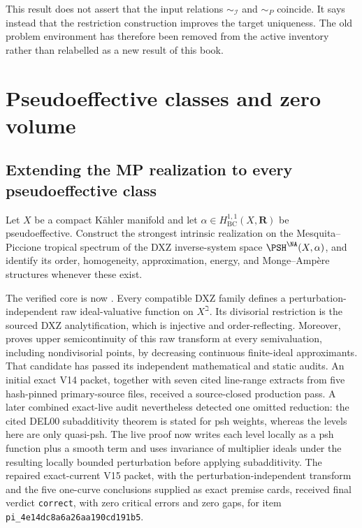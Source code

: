 This result does not assert that the input relations
\(\sim_{\mathcal I}\) and \(\sim_P\) coincide.  It says instead that the
restriction construction improves the target uniqueness.  The old problem
environment has therefore been removed from the active inventory rather
than relabelled as a new result of this book.

\section{Pseudoeffective classes and zero volume}
\label{sec:ch72-pseff-frontier}

\subsection{Extending the MP realization to every pseudoeffective class}
\label{sec:ch72-mp-pseff}

\begin{problem}\label{prob:frontier-mp-pseff}
Let \(X\) be a compact Kähler manifold and let
\(\alpha\in H^{1,1}_{\mathrm{BC}}(X,\mathbf R)\) be pseudoeffective.
Construct the strongest intrinsic realization on the Mesquita--Piccione
tropical spectrum of the DXZ inverse-system space
\(\PSH^{\NA}(X,\alpha)\), and identify its order, homogeneity,
approximation, energy, and Monge--Ampère structures whenever these exist.
\end{problem}

The verified core is now .  Every compatible DXZ
family defines a perturbation-independent raw ideal-valuative function on
\(X^\beth\).  Its divisorial restriction is the sourced DXZ
analytification, which is injective and order-reflecting.  Moreover,
proves upper semicontinuity of this raw transform at every semivaluation,
including nondivisorial points, by decreasing continuous finite-ideal
approximants.  That candidate has passed its independent mathematical and
static audits.  An initial exact V14 packet, together with seven cited
line-range extracts from five hash-pinned primary-source files, received a
source-closed production pass.  A later combined exact-live audit nevertheless
detected one omitted reduction: the cited DEL00 subadditivity theorem is stated
for psh weights, whereas the levels here are only quasi-psh.  The live proof now
writes each level locally as a psh function plus a smooth term and uses
invariance of multiplier ideals under the resulting locally bounded
perturbation before applying subadditivity.  The repaired exact-current V15
packet, with the perturbation-independent transform and the five one-curve
conclusions supplied as exact premise cards, received final verdict
\texttt{correct}, with zero critical errors and zero gaps, for item
\nolinkurl{pi_4e14dc8a6a26aa190cd191b5}.

